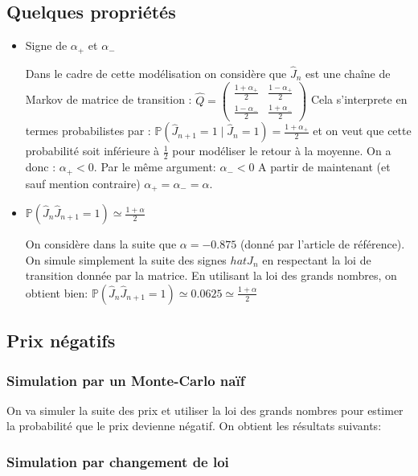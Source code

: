 \documentclass[a4paper,11pt]{article}
\begin{document}
\subsection{Quelques propriétés}

\begin{itemize}

\item Signe de $\alpha_{+}$ et $\alpha_{-}$

Dans le cadre de cette modélisation on considère que $\hat{J}_{n}$ est une chaîne de Markov de matrice de transition :
$\hat{Q} = \begin{pmatrix}
\frac{1+\alpha_{+}}{2} & \frac{1-\alpha_{+}}{2} \\ 
 \frac{1-\alpha_{-}}{2}  & \frac{1+\alpha_{-}}{2} 
\end{pmatrix}$
Cela s'interprete en termes probabilistes par :
$\mathbb{P}(\hat{J}_{n+1}=1\mid \hat{J}_{n}=1)=\frac{1+\alpha_{+}}{2}$ et on veut que cette probabilité soit inférieure à $\frac{1}{2}$ pour modéliser le retour à la moyenne. On a donc : $\alpha_{+}<0$. Par le même argument: $\alpha_{-}<0$
A partir de maintenant (et sauf mention contraire) $\alpha_{+}=\alpha_{-}=\alpha$.

\item $\mathbb{P} (\hat{J}_{n}\hat{J}_{n+1}=1) \simeq \frac{1+\alpha }{2}$

On considère dans la suite que $\alpha = -0.875$ (donné par l'article de référence). On simule simplement la suite des signes $hat{J}_{n}$  en respectant la loi de transition donnée par la matrice. En utilisant la loi des grands nombres, on obtient bien:
$\mathbb{P} (\hat{J}_{n}\hat{J}_{n+1}=1) \simeq 0.0625 \simeq \frac{1+\alpha }{2}$

\end{itemize}

\subsection{Prix négatifs}


\subsubsection{Simulation par un Monte-Carlo naïf}
On va simuler la suite des prix et utiliser la loi des grands nombres pour estimer la probabilité que le prix devienne négatif. On obtient les résultats suivants:


\subsubsection{Simulation par changement de loi}
\end{document}
